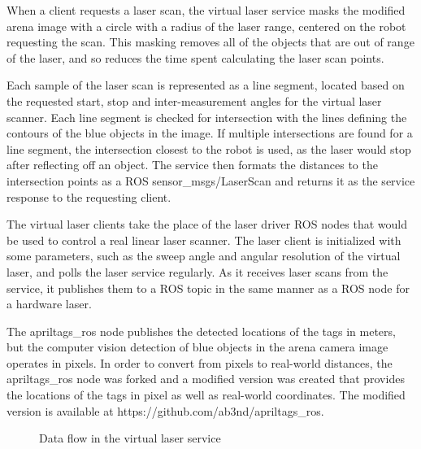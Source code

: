 \documentclass[]{article}
\begin{document}
When a client requests a laser scan, the virtual laser service masks the modified arena image with a circle with a radius of the laser range, centered on the robot requesting the scan.
This masking removes all of the objects that are out of range of the laser, and so reduces the time spent calculating the laser scan points. 

Each sample of the laser scan is represented as a line segment, located based on the requested start, stop and inter-measurement angles for the virtual laser scanner. 
Each line segment is checked for intersection with the lines defining the contours of the blue objects in the image. 
If multiple intersections are found for a line segment, the intersection closest to the robot is used, as the laser would stop after reflecting off an object.
The service then formats the distances to the intersection points as a ROS sensor\_msgs/LaserScan and returns it as the service response to the requesting client. 

The virtual laser clients take the place of the laser driver ROS nodes that would be used to control a real linear laser scanner. 
The laser client is initialized with some parameters, such as the sweep angle and angular resolution of the virtual laser, and polls the laser service regularly. 
As it receives laser scans from the service, it publishes them to a ROS topic in the same manner as a ROS node for a hardware laser. 

The apriltags\_ros node publishes the detected locations of the tags in meters, but the computer vision detection of blue objects in the arena camera image operates in pixels. 
In order to convert from pixels to real-world distances, the apriltags\_ros node was forked and a modified version was created that provides the locations of the tags in pixel as well as real-world coordinates. 
The modified version is available at https://github.com/ab3nd/apriltags\_ros.

\begin{figure}
	\centering
	\caption{Data flow in the virtual laser service}
\end{figure}
\end{document}
